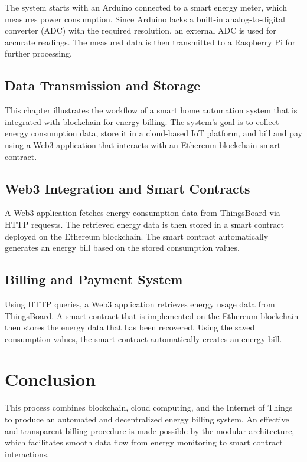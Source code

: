 \documentclass[a4paper,12pt]{report}
\begin{document}
The system starts with an Arduino connected to a smart energy meter, which measures power consumption. Since Arduino lacks a built-in analog-to-digital converter (ADC) with the required resolution, an external ADC is used for accurate readings. The measured data is then transmitted to a Raspberry Pi for further processing.

\subsection{Data Transmission and Storage}

This chapter illustrates the workflow of a smart home automation system that is integrated with blockchain for energy billing.  The system's goal is to collect energy consumption data, store it in a cloud-based IoT platform, and bill and pay using a Web3 application that interacts with an Ethereum blockchain smart contract.

\subsection{Web3 Integration and Smart Contracts}

A Web3 application fetches energy consumption data from ThingsBoard via HTTP requests. The retrieved energy data is then stored in a smart contract deployed on the Ethereum blockchain. The smart contract automatically generates an energy bill based on the stored consumption values.

\subsection{Billing and Payment System}

Using HTTP queries, a Web3 application retrieves energy usage data from ThingsBoard.  A smart contract that is implemented on the Ethereum blockchain then stores the energy data that has been recovered.  Using the saved consumption values, the smart contract automatically creates an energy bill.

\section{Conclusion}

This process combines blockchain, cloud computing, and the Internet of Things to produce an automated and decentralized energy billing system.  An effective and transparent billing procedure is made possible by the modular architecture, which facilitates smooth data flow from energy monitoring to smart contract interactions.
\end{document}
